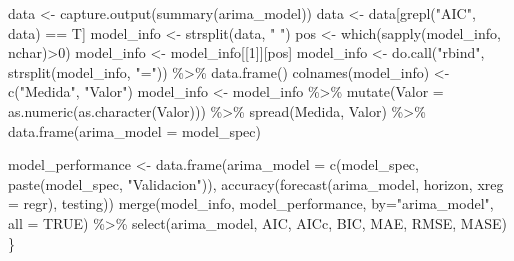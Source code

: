 \documentclass[
]{article}
\newenvironment{Shaded}{\begin{snugshade}}{\end{snugshade}}
\newcommand{\AttributeTok}[1]{\textcolor[rgb]{0.77,0.63,0.00}{#1}}
\newcommand{\ConstantTok}[1]{\textcolor[rgb]{0.00,0.00,0.00}{#1}}
\newcommand{\DecValTok}[1]{\textcolor[rgb]{0.00,0.00,0.81}{#1}}
\newcommand{\FunctionTok}[1]{\textcolor[rgb]{0.00,0.00,0.00}{#1}}
\newcommand{\NormalTok}[1]{#1}
\newcommand{\OtherTok}[1]{\textcolor[rgb]{0.56,0.35,0.01}{#1}}
\newcommand{\SpecialCharTok}[1]{\textcolor[rgb]{0.00,0.00,0.00}{#1}}
\newcommand{\StringTok}[1]{\textcolor[rgb]{0.31,0.60,0.02}{#1}}
\begin{document}
\begin{Shaded}
\begin{Highlighting}[]
\NormalTok{        data }\OtherTok{\textless{}{-}} \FunctionTok{capture.output}\NormalTok{(}\FunctionTok{summary}\NormalTok{(arima\_model))}
\NormalTok{        data }\OtherTok{\textless{}{-}}\NormalTok{ data[}\FunctionTok{grepl}\NormalTok{(}\StringTok{"AIC"}\NormalTok{, data) }\SpecialCharTok{==}\NormalTok{ T]}
\NormalTok{        model\_info }\OtherTok{\textless{}{-}} \FunctionTok{strsplit}\NormalTok{(data, }\StringTok{" "}\NormalTok{)}
\NormalTok{        pos }\OtherTok{\textless{}{-}} \FunctionTok{which}\NormalTok{(}\FunctionTok{sapply}\NormalTok{(model\_info, nchar)}\SpecialCharTok{\textgreater{}}\DecValTok{0}\NormalTok{)}
\NormalTok{        model\_info }\OtherTok{\textless{}{-}}\NormalTok{ model\_info[[}\DecValTok{1}\NormalTok{]][pos]}
\NormalTok{        model\_info }\OtherTok{\textless{}{-}} \FunctionTok{do.call}\NormalTok{(}\StringTok{"rbind"}\NormalTok{, }\FunctionTok{strsplit}\NormalTok{(model\_info, }\StringTok{"="}\NormalTok{)) }\SpecialCharTok{\%\textgreater{}\%} 
            \FunctionTok{data.frame}\NormalTok{() }
        \FunctionTok{colnames}\NormalTok{(model\_info) }\OtherTok{\textless{}{-}} \FunctionTok{c}\NormalTok{(}\StringTok{"Medida"}\NormalTok{, }\StringTok{"Valor"}\NormalTok{)}
\NormalTok{        model\_info }\OtherTok{\textless{}{-}}\NormalTok{ model\_info }\SpecialCharTok{\%\textgreater{}\%} 
            \FunctionTok{mutate}\NormalTok{(}\AttributeTok{Valor =} \FunctionTok{as.numeric}\NormalTok{(}\FunctionTok{as.character}\NormalTok{(Valor))) }\SpecialCharTok{\%\textgreater{}\%} 
            \FunctionTok{spread}\NormalTok{(Medida, Valor) }\SpecialCharTok{\%\textgreater{}\%} 
            \FunctionTok{data.frame}\NormalTok{(}\AttributeTok{arima\_model =}\NormalTok{ model\_spec)}
        
\NormalTok{        model\_performance }\OtherTok{\textless{}{-}} \FunctionTok{data.frame}\NormalTok{(}\AttributeTok{arima\_model =} \FunctionTok{c}\NormalTok{(model\_spec, }
                                                        \FunctionTok{paste}\NormalTok{(model\_spec, }
                                                              \StringTok{"Validacion"}\NormalTok{)), }
                                        \FunctionTok{accuracy}\NormalTok{(}\FunctionTok{forecast}\NormalTok{(arima\_model, }
\NormalTok{                                                          horizon, }
                                                          \AttributeTok{xreg =}\NormalTok{ regr), }
\NormalTok{                                                 testing))}
        \FunctionTok{merge}\NormalTok{(model\_info, model\_performance, }\AttributeTok{by=}\StringTok{"arima\_model"}\NormalTok{, }\AttributeTok{all =} \ConstantTok{TRUE}\NormalTok{) }\SpecialCharTok{\%\textgreater{}\%} 
            \FunctionTok{select}\NormalTok{(arima\_model, AIC, AICc, BIC, MAE, RMSE, MASE)}
\NormalTok{    \}}
    

\end{Highlighting}
\end{Shaded}
\end{document}
